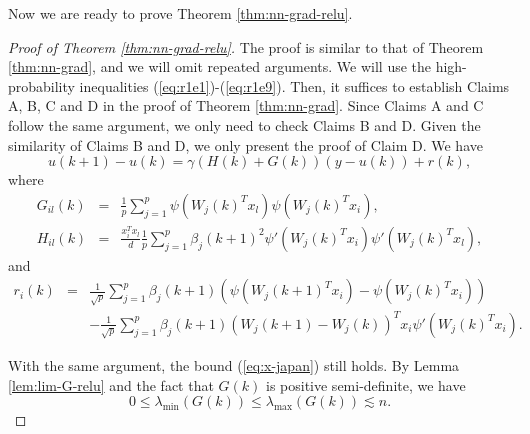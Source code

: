 Now we are ready to prove Theorem \ref{thm:nn-grad-relu}.
\begin{proof}[Proof of Theorem \ref{thm:nn-grad-relu}]
The proof is similar to that of Theorem \ref{thm:nn-grad}, and we will omit repeated arguments. We will use the high-probability inequalities (\ref{eq:r1e1})-(\ref{eq:r1e9}). Then, it suffices to establish Claims A, B, C and D in the proof of Theorem \ref{thm:nn-grad}. Since Claims A and C follow the same argument, we only need to check Claims B and D. Given the similarity of Claims B and D, we only present the proof of Claim D.
We have
\begin{equation}
u(k+1)-u(k)=\gamma(H(k)+G(k))(y-u(k))+r(k), \label{eq:iter-u-relu}
\end{equation}
where
\begin{eqnarray*}
G_{il}(k) &=& \frac{1}{p}\sum_{j=1}^p\psi(W_j(k)^Tx_l)\psi(W_j(k)^Tx_i), \\
H_{il}(k) &=& \frac{x_i^Tx_l}{d}\frac{1}{p}\sum_{j=1}^p\beta_j(k+1)^2\psi'(W_j(k)^Tx_i)\psi'(W_j(k)^Tx_l),
\end{eqnarray*}
and
\begin{eqnarray*}
r_i(k) &=& \frac{1}{\sqrt{p}}\sum_{j=1}^p\beta_j(k+1)\left(\psi(W_j(k+1)^Tx_i)-\psi(W_j(k)^Tx_i)\right) \\
&& - \frac{1}{\sqrt{p}}\sum_{j=1}^p\beta_j(k+1)(W_j(k+1)-W_j(k))^Tx_i\psi'(W_j(k)^Tx_i).
\end{eqnarray*}


With the same argument, the bound (\ref{eq:x-japan}) still holds.
By Lemma \ref{lem:lim-G-relu} and the fact that $G(k)$ is positive semi-definite, we have
\begin{equation}
0 \leq \lambda_{\min}(G(k)) \leq \lambda_{\max}(G(k)) \lesssim n. \label{eq:Gk-spec}
\end{equation}


\end{proof}

